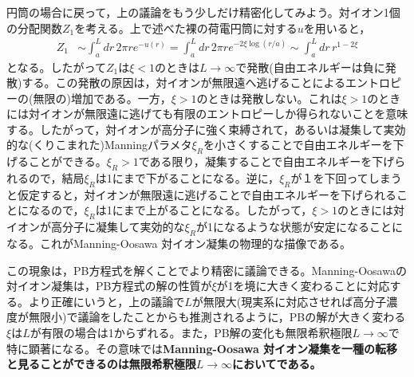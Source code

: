 \documentclass[11pt,a4paper]{ltjsarticle}
\theoremstyle{definition}
\theoremstyle{remark}
\begin{document}
円筒の場合に戻って，上の議論をもう少しだけ精密化してみよう。対イオン1個の分配関数$Z_1$を考える。上で述べた裸の荷電円筒に対する$u$を用いると，
\begin{align}
  Z_1
  &\sim \int_a^L dr\, 2\pi r e^{-u(r)}
  = \int_a^L dr\, 2\pi r e^{-2\xi \log(r/a)}
  \sim \int_a^L dr\, r^{1-2\xi}
\end{align}
となる。したがって$Z_1$は$\xi<1$のときは$L\to\infty$で発散(自由エネルギーは負に発散)する。この発散の原因は，対イオンが無限遠へ逃げることによるエントロピーの(無限の)増加である。一方，$\xi>1$のときは発散しない。これは$\xi>1$のときには対イオンが無限遠に逃げても有限のエントロピーしか得られないことを意味する。したがって，対イオンが高分子に強く束縛されて，あるいは凝集して実効的な(くりこまれた)Manningパラメタ$\xi_R$を小さくすることで自由エネルギーを下げることができる。$\xi_R>1$である限り，凝集することで自由エネルギーを下げられるので，結局$\xi_R$は1にまで下がることになる。逆に，$\xi_R$が１を下回ってしまうと仮定すると，対イオンが無限遠に逃げることで自由エネルギーを下げられることになるので，$\xi_R$は1にまで上がることになる。したがって，$\xi>1$のときには対イオンが高分子に凝集して実効的な$\xi_R$が1になるような状態が安定になることになる。これがManning-Oosawa 対イオン凝集の物理的な描像である。

この現象は，PB方程式を解くことでより精密に議論できる。Manning-Oosawaの対イオン凝集は，PB方程式の解の性質が$\xi$が1を境に大きく変わることに対応する。より正確にいうと，上の議論で$L$が無限大(現実系に対応させれば高分子濃度が無限小)で議論をしたことからも推測されるように，PBの解が大きく変わる$\xi$は$L$が有限の場合は1からずれる。また，PB解の変化も無限希釈極限$L\to\infty$で特に顕著になる。その意味では\textbf{Manning-Oosawa 対イオン凝集を一種の転移と見ることができるのは無限希釈極限$L\to\infty$においてである。}
\end{document}
